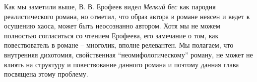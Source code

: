 \documentclass[12pt,a4paper]{article}
\begin{document}
Как мы заметили выше, В. В. Ерофеев видел \emph{Мелкий бес} как пародия реалистического романа, но отметил, что образ автора в романе неясен и ведет к осушению хаоса, может быть неосознанно автором. Хотя мы не можем полностью согласиться со чтением Ерофеева, его замечание о том, как повествователь в романе – многолик, вполне релевантен. Мы полагаем, что внутренняя дихотомия, свойственная \enquote{неомифологическому} роману, не может не влиять на структуру и повествование данного романа и поэтому данная глава посвящена этому проблему.


%

  

\end{document}

